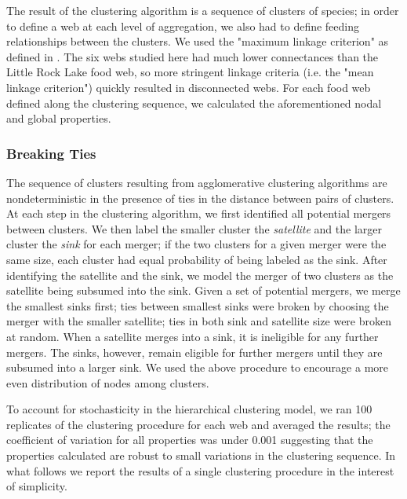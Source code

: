 \documentclass[/home/nkappler/Research/Dissertation/dissertation.tex]{subfiles}
\begin{document}
\begin{bibunit}
The result of the clustering algorithm is a sequence of clusters of species;
in order to define a web at each level of aggregation, we also had to define
feeding relationships between the clusters. We used the "maximum linkage
criterion" as defined in \cite*{Martinez1991}. The six webs studied here had
much lower connectances than the Little Rock Lake food web, so more stringent
linkage criteria (i.e. the "mean linkage criterion") quickly resulted in
disconnected webs. For each food web defined along the clustering sequence, we
calculated the aforementioned nodal and global properties. 

\subsubsection{Breaking Ties} The sequence of clusters resulting from
agglomerative clustering algorithms are nondeterministic in the presence of
ties in the distance between pairs of clusters. At each step in the clustering
algorithm, we first identified all potential mergers between clusters. We then
label the smaller cluster the \textit{satellite} and the larger cluster the
\textit{sink} for each merger; if the two clusters for a given merger were the
same size, each cluster had equal probability of being labeled as the sink.
After identifying the satellite and the sink, we model the merger of two
clusters as the satellite being subsumed into the sink. Given a set of
potential mergers, we merge the smallest sinks first; ties between smallest
sinks were broken by choosing the merger with the smaller satellite; ties in
both sink and satellite size were broken at random. When a satellite merges
into a sink, it is ineligible for any further mergers. The sinks, however,
remain eligible for further mergers until they are subsumed into a larger sink.
We used the above procedure to encourage a more even distribution of nodes
among clusters. 

To account for stochasticity in the hierarchical clustering model, we ran 100
replicates of the clustering procedure for each web and averaged the results;
the coefficient of variation for all properties was under 0.001 suggesting that
the properties calculated are robust to small variations in the clustering
sequence. In what follows we report the results of a single clustering
procedure in the interest of simplicity.



\end{bibunit}
\end{document}
